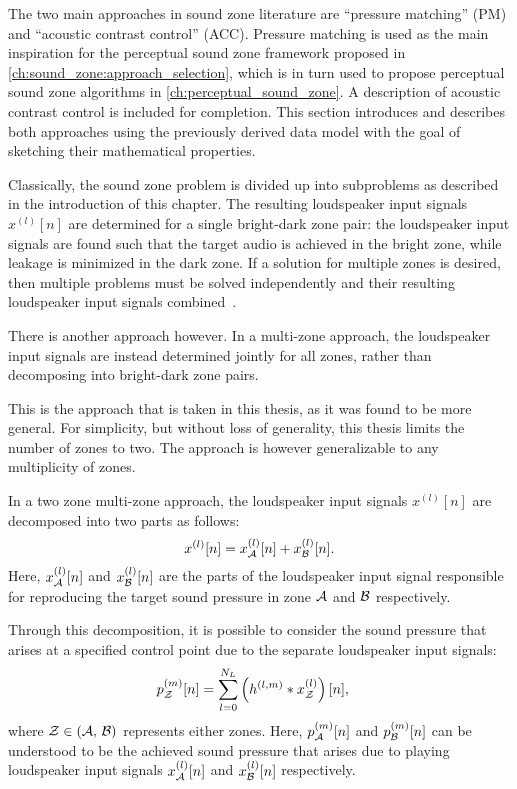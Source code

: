 The two main approaches in sound zone literature are ``pressure matching'' (PM) and ``acoustic contrast control'' (ACC).
Pressure matching is used as the main inspiration for the perceptual sound zone framework 
proposed in \autoref{ch:sound_zone:approach_selection}, which is in turn used to propose perceptual sound zone algorithms 
in \autoref{ch:perceptual_sound_zone}.
A description of acoustic contrast control is included for completion.
This section introduces and describes both approaches using the previously derived data model with the 
goal of sketching their mathematical properties.

Classically, the sound zone problem is divided up into subproblems as described in the introduction of this chapter.
The resulting loudspeaker input signals $x^{(l)}[n]$ are determined for a single bright-dark zone pair:
the loudspeaker input signals are found such that the target audio is achieved in the bright zone, while leakage is minimized in the dark zone.
If a solution for multiple zones is desired, then multiple problems must be solved independently and their resulting loudspeaker input signals combined~\cite{betlehem2015personal}.

There is another approach however.
In a multi-zone approach, the loudspeaker input signals are instead determined jointly for all zones, 
rather than decomposing into bright-dark zone pairs.

This is the approach that is taken in this thesis, as it was found to be more general.
For simplicity, but without loss of generality, this thesis limits the number of zones to two.
The approach is however generalizable to any multiplicity of zones.

In a two zone multi-zone approach, the loudspeaker input signals $x^{(l)}[n]$ are decomposed into two parts as follows:
\begin{equation}
    x^{(l)}[n] = x_{\mathcal{A}}^{(l)}[n] + x_{\mathcal{B}}^{(l)}[n].
\end{equation}
Here, $x_{\mathcal{A}}^{(l)}[n]$ and $x_{\mathcal{B}}^{(l)}[n]$ are the parts of the loudspeaker input signal responsible for reproducing the target sound pressure 
in zone $\mathcal{A}$ and $\mathcal{B}$ respectively.

Through this decomposition, it is possible to consider the sound pressure that arises at a specified control point due to the separate loudspeaker input signals:
\begin{align}
    p_{\mathcal{Z}}^{(m)}[n] &= \sum_{l=0}^{N_L} \left(h^{(l,m)} \ast x_{\mathcal{Z}}^{(l)}\right)[n],
\end{align}
\label{eq:sound_zone:approaches:pressure}
where $\mathcal{Z} \in \left(\mathcal{A},\,\mathcal{B}\right)$ represents either zones.
Here, $p_{\mathcal{A}}^{(m)}[n]$ and $p_{\mathcal{B}}^{(m)}[n]$ can be understood to be the achieved sound pressure that arises due to 
playing loudspeaker input signals $x_{\mathcal{A}}^{(l)}[n]$ and $x_{\mathcal{B}}^{(l)}[n]$ respectively. 

